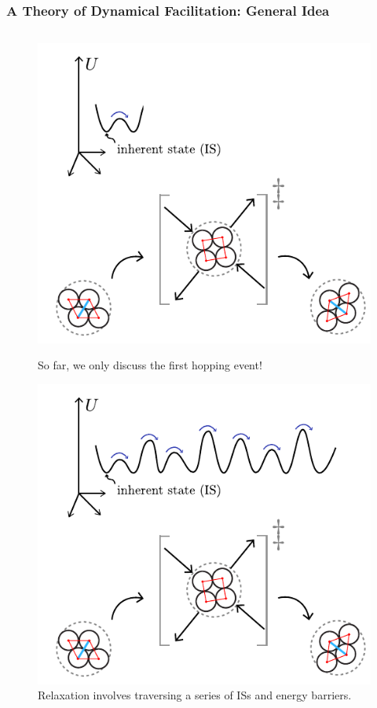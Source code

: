
\begin{frame}\label{d.1}
\frametitle{A Theory of Dynamical Facilitation: General Idea}

\begin{columns}[T]
\begin{column}[T]{0.5\textwidth}

\begin{figure}[t]
\begin{overprint}
\vspace{-10pt}
\includegraphics[width=0.975\linewidth]{d.1-fac_intro/interlude1.pdf}\caption{So far, we only discuss the first hopping event!}

\includegraphics[width=0.975\linewidth]{d.1-fac_intro/interlude2.pdf}\caption{Relaxation involves traversing a series of ISs and energy barriers.}


\end{overprint}
\end{figure}
\end{column}
\end{columns}
\end{frame}
